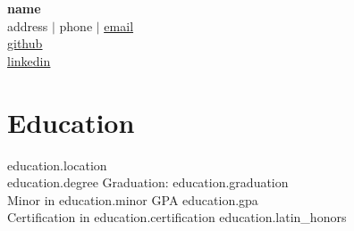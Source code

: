 \documentclass[11pt]{article}
\begin{document}
\begin{center}
     {\LARGE \textbf{ {{ name }} }} \\
        {{ address }} $|$ {{ phone }} $|$ \underline{\href{mailto:{{ email }}}{{ email }}} \\
        \underline{\href{ {{ github }} }{ {{ github }} }} \\
        \underline{\href{ {{ linkedin }} }{ {{ linkedin }} }}
\end{center}

\section*{Education}
\textbf{} \hfill {{ education.location }} \\
{{ education.degree }} \hfill Graduation: {{ education.graduation }} \\
Minor in {{ education.minor }} \hfill GPA {{ education.gpa }} \\
Certification in {{ education.certification }} \hfill {{ education.latin_honors }}

\end{document}
